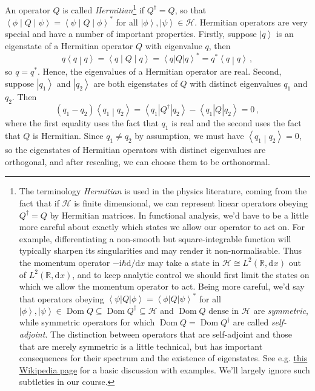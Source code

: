 \documentclass{article}
\theoremstyle{plain}\theoremheaderfont{\normalfont\itshape}\theorembodyfont{\rmfamily}\theoremseparator{.}\newtheorem*{rem}{Remark}\newtheorem*{ex}{Example}\newtheorem*{proof}{Proof}\newtheorem*{altp}{Alternative proof}
\theoremstyle{plain}\theoremheaderfont{\normalfont\bfseries}\theorembodyfont{\rmfamily}\theoremseparator{.}\newtheorem{thm}{Theorem}[section]\newtheorem{lem}[thm]{Lemma}\newtheorem{prop}[thm]{Proposition}\newtheorem*{cor}{Corollary}\newtheorem{defn}[thm]{Definition}\newtheorem{clm}[thm]{Claim}\newtheorem{clminproof}{Claim}
\theoremstyle{break}\theoremheaderfont{\normalfont\itshape}\theorembodyfont{\rmfamily}\theoremseparator{.\medskip}\newtheorem*{proofskip}{Proof}\newtheorem*{exs}{Examples}\newtheorem*{rems}{Remarks}
\theoremstyle{break}\theoremheaderfont{\normalfont\bfseries}\theorembodyfont{\rmfamily}\theoremseparator{.\medskip}\newtheorem{lemskip}[thm]{Lemma}\newtheorem{defnskip}[thm]{Definition}\newtheorem{propskip}[thm]{Proposition}\newtheorem{thmskip}[thm]{Theorem}
\numberwithin{equation}{section}
\newcommand{\ii}{\mathrm{i}}
\renewcommand{\d}[2][]{\mathrm{d}^{#1} #2}
\newcommand{\bra}[1]{\left\langle #1 \right|}
\newcommand{\ket}[1]{\left| #1 \right\rangle}
\newcommand{\braket}[2]{\left\langle #1 \middle| #2 \right\rangle}
\newcommand{\mel}[3]{\left\langle #1 \middle| #2 \middle| #3 \right\rangle}
\newcommand{\hb}{\mathcal{H}}
\DeclareMathOperator{\Dom}{Dom}
\newcommand{\RR}{\mathbb{R}}
\begin{document}
    An operator \(Q\) is called \textit{Hermitian}\footnote{The terminology \textit{Hermitian} is used in the physics literature, coming from the fact that if \(\hb\) is finite dimensional, we can represent linear operators obeying \(Q^\dagger=Q\) by Hermitian matrices. In functional analysis, we'd have to be a little more careful about exactly which states we allow our operator to act on. For example, differentiating a non-smooth but square-integrable function will typically sharpen its singularities and may render it non-normalisable. Thus the momentum operator \(-\ii\hbar\mathrm{d}/\mathrm{d}x\) may take a state in \(\hb\cong L^2(\RR,\d{x})\) out of \(L^2(\RR,\d{x})\), and to keep analytic control we should first limit the states on which we allow the momentum operator to act. Being more careful, we'd say that operators obeying \(\bra{\psi}Q\ket{\phi}=\bra{\phi}Q\ket{\psi}^*\) for all \(\ket{\phi},\ket{\psi}\in\Dom Q\subseteq\Dom Q^\dagger\subseteq\hb\) and \(\Dom Q\) dense in \(\hb\) are \textit{symmetric}, while symmetric operators for which \(\Dom Q=\Dom Q^\dagger\) are called \textit{self-adjoint}. The distinction between operators that are self-adjoint and those that are merely symmetric is a little technical, but has important consequences for their spectrum and the existence of eigenstates. See e.g. \textcolor{blue}{\href{https://en.wikipedia.org/wiki/Self-adjoint_operator}{this Wikipedia page}} for a basic discussion with examples. We'll largely ignore such subtleties in our course.} if \(Q^\dagger=Q\), so that \(\mel{\phi}{Q}{\psi}=\mel{\psi}{Q}{\phi}^*\) for all \(\ket{\phi},\ket{\psi}\in\hb\). Hermitian operators are very special and have a number of important properties. Firstly, suppose \(\ket{q}\) is an eigenstate of a Hermitian operator \(Q\) with eigenvalue \(q\), then
    \begin{equation}
        q\braket{q}{q}=\mel{q}{Q}{q}=\bra{q}Q\ket{q}^*=q^*\braket{q}{q}\,,
    \end{equation}
    so \(q=q^*\). Hence, the eigenvalues of a Hermitian operator are real. Second, suppose \(\ket{q_1}\) and \(\ket{q_2}\) are both eigenstates of \(Q\) with distinct eigenvalues \(q_1\) and \(q_2\). Then
    \begin{equation}
        (q_1-q_2)\braket{q_1}{q_2}=\bra{q_1}Q^\dagger\ket{q_2}-\bra{q_1}Q\ket{q_2}=0\,,
    \end{equation}
    where the first equality uses the fact that \(q_1\) is real and the second uses the fact that \(Q\) is Hermitian. Since \(q_1\ne q_2\) by assumption, we must have \(\braket{q_1}{q_2}=0\), so the eigenstates of Hermitian operators with distinct eigenvalues are orthogonal, and after rescaling, we can choose them to be orthonormal.
\end{document}
